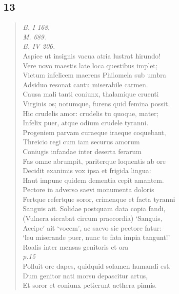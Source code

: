 \documentclass[11pt, a4paper]{report}
\begin{document}
            \subsection*{13}
      \begin{verse}
      \textit{B. I 168.} \\ \textit{M. 689.} \\ \textit{B. IV 206.} \\ Aspice ut insignis vacua atria lustrat hirundo! \\ Vere novo maestis late loca questibus implet; \\ Victum infelicem maerens Philomela sub umbra \\ Adsiduo resonat cantu miserabile carmen. \\ Causa mali tanti coniunx, thalamique cruenti \\ Virginis os; notumque, furens quid femina possit. \\ Hic crudelis amor: crudelis tu quoque, mater; \\ Infelix puer, atque odium crudele tyranni. \\ Progeniem parvam curaeque iraeque coquebant, \\ Threicio regi cum iam securus amorum \\ Coniugis infandae inter deserta ferarum \\ Fas omne abrumpit, pariterque loquentis ab ore \\ Decidit exanimis vox ipsa  \lbrack et frigida lingua: \\ Haut impune quidem dementia cepit amantem. \\ Pectore in adverso saevi monumenta doloris \\ Fertque refertque soror, crimenque  \lbrack et \rbrack  facta tyranni \\ Sanguis ait. Solidae postquam data copia fandi, \\ (Vulnera siccabat circum praecordia) ‘Sanguis, \\ Accipe’  \lbrack ait \rbrack  ‘vocem’, ac saevo sic pectore fatur: \\ ‘leu miserande puer, nunc te fata impia tangunt!’ \\ Roalis inter mensas genitoris et ora \\ \textit{p.15} \\ Polluit ore dapes, quidquid solamen humandi est. \\ Dum genitor nati morsu depascitur artus, \\ Et soror et coniunx petierunt aethera pinnis. \\ 
      \end{verse}
  
\end{document}
